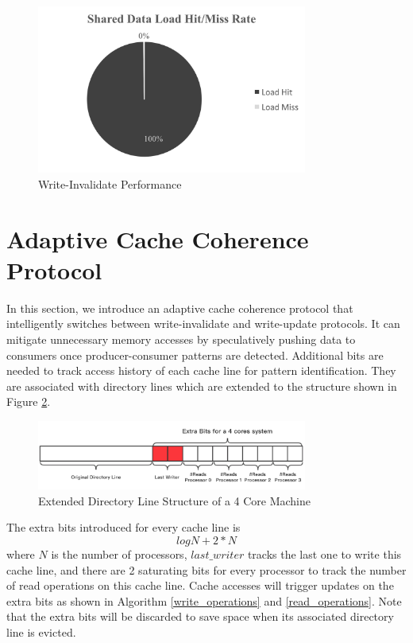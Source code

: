 \documentclass[conference]{IEEEtran}
\begin{document}
\begin{figure}[!h]
\centering
\includegraphics[width=3.5in]{write_update_1.png}
\caption{Write-Invalidate Performance}
\label{write_update_1}
\end{figure}
\FloatBarrier

\newpage

\section{Adaptive Cache Coherence Protocol}
In this section, we introduce an adaptive cache coherence protocol that intelligently switches between write-invalidate and write-update protocols. It can mitigate unnecessary memory accesses by speculatively pushing data to consumers once producer-consumer patterns are detected. Additional bits are needed to track access history of each cache line for pattern identification. They are associated with directory lines which are extended to the structure shown in Figure \ref{dir_line}.

\begin{figure}[!h]
\centering
\captionsetup{justification=centering}
\includegraphics[width=3.5in]{dir_line.png}
\caption{Extended Directory Line Structure of a 4 Core Machine}
\label{dir_line}
\end{figure}
\FloatBarrier

The extra bits introduced for every cache line is
\begin{equation*}
log N + 2 * N
\end{equation*}
where $N$ is the number of processors, $last\_writer$ tracks the last one to write this cache line, and there are 2 saturating bits for every processor to track the number of read operations on this cache line. Cache accesses will trigger updates on the extra bits as shown in Algorithm \ref{write_operations} and \ref{read_operations}. Note that the extra bits will be discarded to save space when its associated directory line is evicted.
\end{document}
